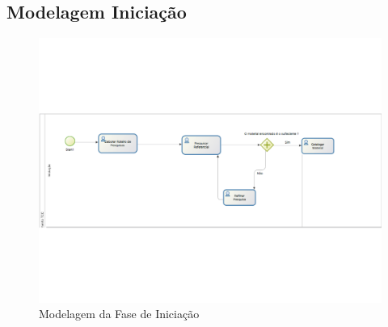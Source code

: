 \begin{apendicesenv}
\chapter{Modelagem Iniciação}
\graphicspath{{figuras/}}
\begin{figure}
\centering
\includegraphics[scale=0.80]{iniciacao}
\caption{Modelagem da Fase de Iniciação}
\label{img:iniciacao}
\end{figure}


\end{apendicesenv}
